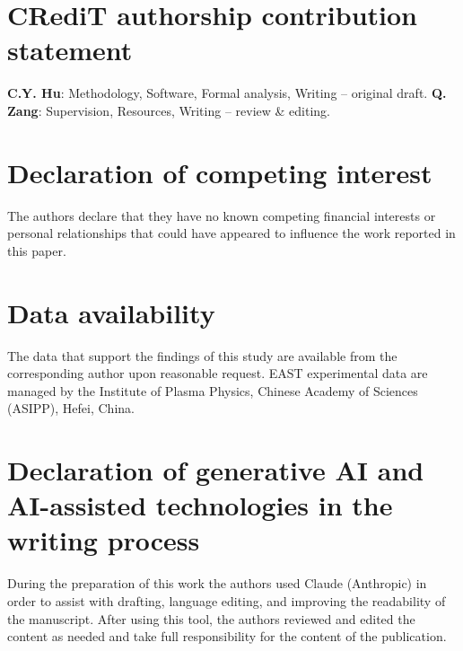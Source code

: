 \documentclass[a4paper,12pt]{article}
\begin{document}
\section*{CRediT authorship contribution statement}

\textbf{C.Y. Hu}: Methodology, Software, Formal analysis, Writing -- original draft. \textbf{Q. Zang}: Supervision, Resources, Writing -- review \& editing.

\section*{Declaration of competing interest}

The authors declare that they have no known competing financial interests or personal relationships that could have appeared to influence the work reported in this paper.

\section*{Data availability}

The data that support the findings of this study are available from the corresponding author upon reasonable request. EAST experimental data are managed by the Institute of Plasma Physics, Chinese Academy of Sciences (ASIPP), Hefei, China.

\section*{Declaration of generative AI and AI-assisted technologies in the writing process}
During the preparation of this work the authors used Claude (Anthropic) in order to assist with drafting, language editing, and improving the readability of the manuscript. After using this tool, the authors reviewed and edited the content as needed and take full responsibility for the content of the publication.
\end{document}
